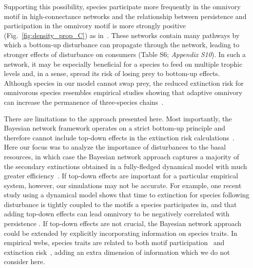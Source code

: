 \documentclass[12pt]{article}
\begin{document}
\begin{spacing}{2.0}
    Supporting this possibility, species participate more frequently in the omnivory motif in high-connectance networks and the relationship between persistence and participation in the omnivory motif is more strongly positive (Fig.~\ref{fig:density_prop_C}) as in~\citet{McLeod2021}.
    These networks contain many pathways by which a bottom-up disturbance can propagate through the network, leading to stronger effects of disturbance on consumers (Table S6; \emph{Appendix S10}).
    In such a network, it may be especially beneficial for a species to feed on multiple trophic levels and, in a sense, spread its risk of losing prey to bottom-up effects.
    Although species in our model cannot swap prey, the reduced extinction risk for omnivorous species resembles empirical studies showing that adaptive omnivory can increase the permanence of three-species chains~\citep{Fagan1997, Kvrivan2005, AbramsFung2010}.
    
    
    There are limitations to the approach presented here.
    Most importantly, the Bayesian network framework operates on a strict bottom-up principle and therefore cannot include top-down effects in the extinction risk calculations~\citep{Eklof2013}. 
    Here our focus was to analyze the importance of disturbances to the basal resources, in which case the Bayesian network approach captures a majority of the secondary extinctions obtained in a fully-fledged dynamical model with much greater efficiency~\citep{Eklof2013}.
    If top-down effects are important for a particular empirical system, however, our simulations may not be accurate. 
    For example, one recent study using a dynamical model shows that time to extinction for species following disturbance is tightly coupled to the motifs a species participates in, and that adding top-down effects can lead omnivory to be negatively correlated with persistence \citep{Cirtwill2021_inprep}. 
    If top-down effects are not crucial, the Bayesian network approach could be extended by explicitly incorporating information on species traits.
    In empirical webs, species traits are related to both motif participation~\citep{cirtwill2018feeding} and extinction risk~\citep{Brose2017, curtsdotter2011robustness, Cardillo2005, Purvis2000},
    adding an extra dimension of information which we do not consider here.
    

\end{spacing}
\end{document}
